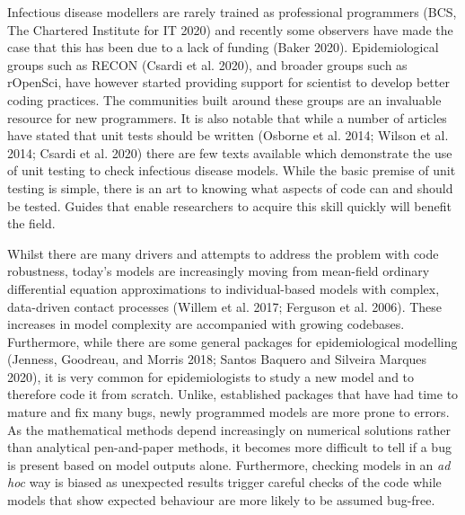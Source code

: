 \documentclass[]{elsarticle} %
\begin{document}
Infectious disease modellers are rarely trained as professional programmers (BCS, The Chartered Institute for IT 2020) and recently some observers have made the case that this has been due to a lack of funding (Baker 2020).
Epidemiological groups such as RECON (Csardi et al. 2020), and broader groups such as rOpenSci, have however started providing support for scientist to develop better coding practices.
The communities built around these groups are an invaluable resource for new programmers.
It is also notable that while a number of articles have stated that unit tests should be written (Osborne et al. 2014; Wilson et al. 2014; Csardi et al. 2020) there are few texts available which demonstrate the use of unit testing to check infectious disease models.
While the basic premise of unit testing is simple, there is an art to knowing what aspects of code can and should be tested.
Guides that enable researchers to acquire this skill quickly will benefit the field.

Whilst there are many drivers and attempts to address the problem with code robustness, today's models are increasingly moving from mean-field ordinary differential equation approximations to individual-based models with complex, data-driven contact processes (Willem et al. 2017; Ferguson et al. 2006).
These increases in model complexity are accompanied with growing codebases.
Furthermore, while there are some general packages for epidemiological modelling (Jenness, Goodreau, and Morris 2018; Santos Baquero and Silveira Marques 2020), it is very common for epidemiologists to study a new model and to therefore code it from scratch.
Unlike, established packages that have had time to mature and fix many bugs, newly programmed models are more prone to errors.
As the mathematical methods depend increasingly on numerical solutions rather than analytical pen-and-paper methods, it becomes more difficult to tell if a bug is present based on model outputs alone.
Furthermore, checking models in an \emph{ad hoc} way is biased as unexpected results trigger careful checks of the code while models that show expected behaviour are more likely to be assumed bug-free.
\end{document}
